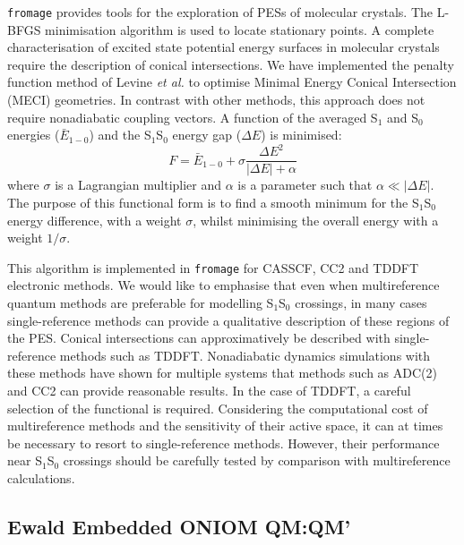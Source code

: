  \texttt{fromage} provides tools for the exploration of PESs of molecular crystals. The L-BFGS minimisation algorithm is used to locate stationary points. A complete characterisation of excited state potential energy surfaces in molecular crystals require the description of conical intersections. We have implemented the penalty function method of Levine \textit{et al.}\cite{Levine2008} to optimise Minimal Energy Conical Intersection (MECI) geometries. In contrast with other methods,\cite{Ruiz2015} this approach does not require nonadiabatic coupling vectors. A function of the averaged S$_1$ and S$_0$ energies ($\bar{E}_{1-0}$) and the S$_1$\textendash{}S$_0$ energy gap ($\Delta E$) is minimised:
\begin{equation}
\label{eq:ciopt}
F = \bar{E}_{1-0} + \sigma \frac{\Delta E^2}{|\Delta E|+ \alpha}
\end{equation}
where $\sigma$ is a Lagrangian multiplier and $\alpha$ is a parameter such that $\alpha \ll |\Delta E|$. The purpose of this functional form is to find a smooth minimum for the S$_1$\textendash{}S$_0$ energy difference, with a weight $\sigma$, whilst minimising the overall energy with a weight $1/\sigma$.

This algorithm is implemented in \texttt{fromage} for CASSCF, CC2 and TDDFT electronic methods. We would like to emphasise that even when multireference quantum methods are preferable for modelling S$_1$\textendash{}S$_0$ crossings,\cite{Levine2007,Barbatti2014} in many cases single-reference methods can provide a qualitative description of these regions of the PES. Conical intersections can approximatively be described with single-reference methods such as TDDFT.\cite{Barbatti2014} Nonadiabatic dynamics simulations with these methods have shown for multiple systems that methods such as ADC(2) and CC2 can provide reasonable results.\cite{Gozem2014a,Tuna2015} In the case of TDDFT, a careful selection of the functional is required.\cite{Crespo-Otero2014,Barbatti2015} Considering the computational cost of multireference methods and the sensitivity of their active space, it can at times be necessary to resort to single-reference methods. However, their performance near S$_1$\textendash{}S$_0$ crossings should be carefully tested by comparison with multireference calculations.




\subsection{Ewald Embedded ONIOM QM:QM'}
\label{sec:oniom_energy}

